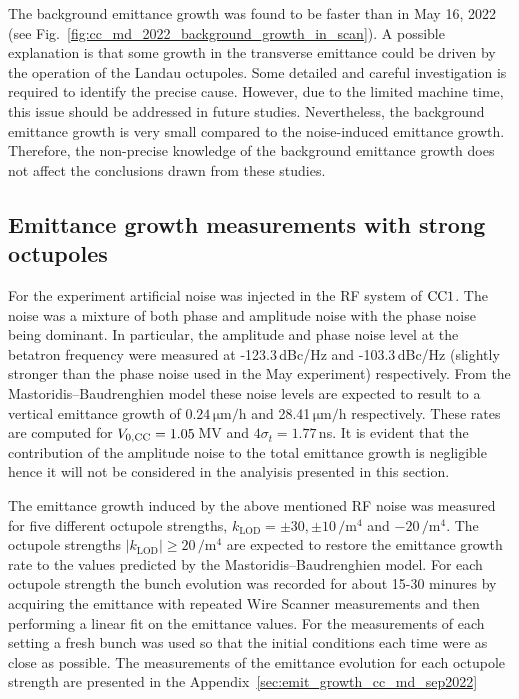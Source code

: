 The background emittance growth was found to be faster than in May 16, 2022 (see Fig.~\ref{fig:cc_md_2022_background_growth_in_scan}). A possible explanation is that some growth in the transverse emittance could be driven by the operation of the Landau octupoles. Some detailed and careful investigation is required to identify the precise cause. However, due to the limited machine time, this issue should be addressed in future studies. Nevertheless, the background emittance growth is very small compared to the noise-induced emittance growth. Therefore, the non-precise knowledge of the background emittance growth does not affect the conclusions drawn from these studies. 


\subsection{Emittance growth measurements with strong octupoles}
For the experiment artificial noise was injected in the RF system of ${\mathrm{CC}}1$. The noise was a mixture of both phase and amplitude noise with the phase noise being dominant. In particular, the amplitude and phase noise level at the betatron frequency were measured at -123.3\,dBc/Hz and -103.3\,dBc/Hz (slightly stronger than the phase noise used in the May experiment) respectively. From the Mastoridis--Baudrenghien model these noise levels are expected to result to a vertical emittance growth of $0.24$\,$\mathrm{\mu m/h}$ and 28.41\,$\mathrm{\mu m/h}$ respectively. These rates are computed for ${V_\mathrm{0, CC}}=1.05$\,MV and $4\sigma_t=1.77$\,ns. It is evident that the contribution of the amplitude noise to the total emittance growth is negligible hence it will not be considered in the analyisis presented in this section.

The emittance growth induced by the above mentioned RF noise was measured for five different octupole strengths, $k_\mathrm{LOD}=\pm 30, \pm 10$\,$\mathrm{/m^4}$ and $-20$\,$\mathrm{/m^4}$. The octupole strengths $| k_\mathrm{LOD} | \geq 20$\,$\mathrm{/m^4}$ are expected to restore the emittance growth rate to the values predicted by the Mastoridis--Baudrenghien model. For each octupole strength the bunch evolution was recorded for about 15-30 minures by acquiring the emittance with repeated Wire Scanner measurements and then performing a linear fit on the emittance values. For the measurements of each setting a fresh bunch was used so that the initial conditions each time were as close as possible. The measurements of the emittance evolution for each octupole strength are presented in the Appendix~\ref{sec:emit_growth_cc_md_sep2022}


